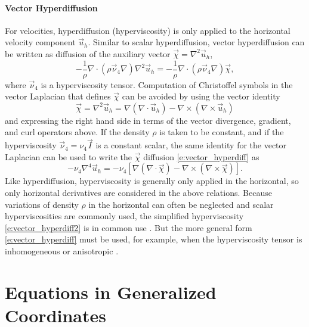 \documentclass{report}
\begin{document}
\paragraph{Vector Hyperdiffusion} For velocities, hyperdiffusion (hyperviscosity) is only applied to the horizontal velocity component $\vec{u}_h$. Similar to scalar hyperdiffusion, vector hyperdiffusion can be written as diffusion of the auxiliary vector $\vec{\chi} = \nabla^2 \vec{u}_h$,
\begin{equation}\label{e:vector_hyperdiff}
    -\frac{1}{\rho} \nabla \cdot (\rho \vec{\mathcal{\nu}}_4 \nabla) \nabla^2 \vec{u}_h =  - \frac{1}{\rho} \nabla \cdot (\rho \vec{\mathcal{\nu}}_4 \nabla) \vec{\chi},
\end{equation}
where $\vec{\nu}_4$ is a hyperviscosity tensor. Computation of Christoffel symbols in the vector Laplacian that defines $\vec{\chi}$ can be avoided by using the vector identity  
\begin{equation}
\vec{\chi} = \nabla^2 \vec{u}_h = \nabla(\nabla\cdot\vec{u}_h) - \nabla \times (\nabla \times \vec{u}_h)
\end{equation}
and expressing the right hand side in terms of the vector divergence, gradient, and curl operators above. If the density $\rho$ is taken to be constant, and if the hyperviscosity $\vec{\nu}_4 = \nu_4 \vec{I}$ is a constant scalar, the same identity for the vector Laplacian can be used to write the $\vec{\chi}$ diffusion \eqref{e:vector_hyperdiff} as
\begin{equation}\label{e:vector_hyperdiff2}
    -\nu_4 \nabla^4 \vec{u}_h =  - \nu_4 \left[ \nabla(\nabla\cdot\vec{\chi}) - \nabla \times (\nabla \times \vec{\chi})\right].
\end{equation}
Like hyperdiffusion, hyperviscosity is generally only applied in the horizontal, so only horizontal derivatives are considered in the above relations. Because variations of density $\rho$ in the horizontal can often be neglected and scalar hyperviscosities are commonly used, the simplified hyperviscosity \eqref{e:vector_hyperdiff2} is in common use \citep{Dennis12a}. But the more general form \eqref{e:vector_hyperdiff} must be used, for example, when the hyperviscosity tensor is inhomogeneous or anisotropic \citep{Guba14a}.

\section{Equations in Generalized Coordinates}\label{e:EOM_general_coord}
\end{document}
